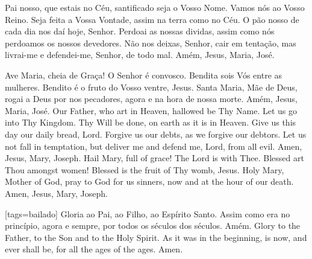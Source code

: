 {\begin{songs}{}
      \beginverse
        \subtitle{Pai nosso}
        Pai nosso,
        que estais no Céu,
        santificado seja o Vosso Nome.
        Vamos nós ao Vosso Reino.
        Seja feita a Vossa Vontade,
        assim na terra como no Céu.
        O pão nosso de cada dia nos daí hoje, Senhor.
        Perdoai as nossas dividas,
        assim como nós perdoamos os nossos devedores.
        Não nos deixas, Senhor, cair em tentação,
        mas livrai-me e defendei-me, Senhor,
        de todo mal.
        \parspace
        Amém, Jesus, Maria, José.
      \endverse
      \beginverse
        \subtitle{Ave Maria}
        Ave Maria,
        cheia de Graça!
        O Senhor é convosco.
        Bendita sois Vós entre as mulheres.
        Bendito é o fruto do Vosso ventre, Jesus.
        Santa Maria, Mãe de Deus,
        rogai a Deus por nos pecadores,
        agora e na hora de nossa morte.
        \parspace
        Amém, Jesus, Maria, José.
      \endverse
      \forcebrk\vspace*{\fill}
      \beginverse\color{englishcolor}
        Our Father,
        who art in Heaven,
        hallowed be Thy Name.
        Let us go into Thy Kingdom.
        Thy Will be done,
        on earth as it is in Heaven.
        Give us this day our daily bread, Lord.
        Forgive us our debts,
        as we forgive our debtors.
        Let us not fall in temptation,
        but deliver me and defend me, Lord,
        from all evil.
        \parspace
        Amen, Jesus, Mary, Joseph.
      \endverse
      \beginverse\color{englishcolor}
        Hail Mary,
        full of grace!
        The Lord is with Thee.
        Blessed art Thou amongst women!
        Blessed is the fruit of Thy womb, Jesus.
        Holy Mary, Mother of God,
        pray to God for us sinners,
        now and at the hour of our death.
        \parspace
        Amen, Jesus, Mary, Joseph.
      \endverse
      \vspace*{\fill}
    \endsong


    [tags={bailado}]
      \beginverse
        \parspace
        Gloria ao Pai, ao Filho, ao Espírito Santo.
        Assim como era no princípio, agora e sempre,
        por todos os séculos dos séculos.
        \parspace
        Amém.
      \endverse
      \beginverse\color{englishcolor}
        \parspace
        Glory to the Father, to the Son and to the Holy Spirit.
        As it was in the beginning, is now, and ever shall be,
        for all the ages of the ages.
        \parspace
        Amen.
      \endverse
    \endsong



\end{songs}}

